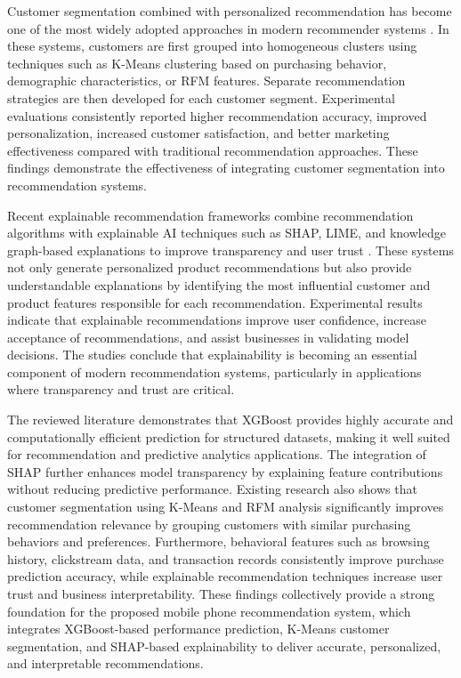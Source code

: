 \documentclass[12pt, a4paper]{report}
\numberwithin{figure}{chapter}
\numberwithin{table}{chapter}
\numberwithin{equation}{chapter}
\begin{document}
Customer segmentation combined with personalized recommendation has become one of the most widely adopted approaches in modern recommender systems \cite{segmentrecommend}. In these systems, customers are first grouped into homogeneous clusters using techniques such as K-Means clustering based on purchasing behavior, demographic characteristics, or RFM features. Separate recommendation strategies are then developed for each customer segment. Experimental evaluations consistently reported higher recommendation accuracy, improved personalization, increased customer satisfaction, and better marketing effectiveness compared with traditional recommendation approaches. These findings demonstrate the effectiveness of integrating customer segmentation into recommendation systems.

Recent explainable recommendation frameworks combine recommendation algorithms with explainable AI techniques such as SHAP, LIME, and knowledge graph-based explanations to improve transparency and user trust \cite{xairecommend}. These systems not only generate personalized product recommendations but also provide understandable explanations by identifying the most influential customer and product features responsible for each recommendation. Experimental results indicate that explainable recommendations improve user confidence, increase acceptance of recommendations, and assist businesses in validating model decisions. The studies conclude that explainability is becoming an essential component of modern recommendation systems, particularly in applications where transparency and trust are critical.

The reviewed literature demonstrates that XGBoost provides highly accurate and computationally efficient prediction for structured datasets, making it well suited for recommendation and predictive analytics applications. The integration of SHAP further enhances model transparency by explaining feature contributions without reducing predictive performance. Existing research also shows that customer segmentation using K-Means and RFM analysis significantly improves recommendation relevance by grouping customers with similar purchasing behaviors and preferences. Furthermore, behavioral features such as browsing history, clickstream data, and transaction records consistently improve purchase prediction accuracy, while explainable recommendation techniques increase user trust and business interpretability. These findings collectively provide a strong foundation for the proposed mobile phone recommendation system, which integrates XGBoost-based performance prediction, K-Means customer segmentation, and SHAP-based explainability to deliver accurate, personalized, and interpretable recommendations.
\end{document}
